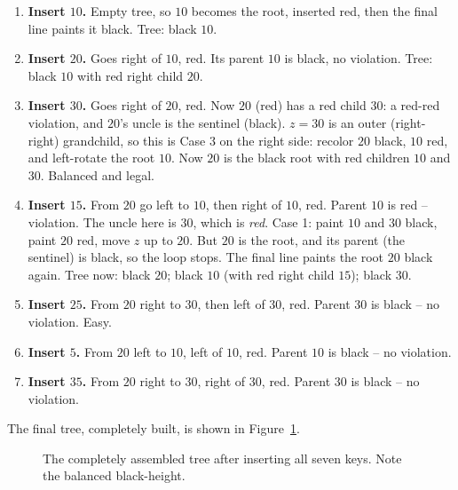\begin{enumerate}
\item \textbf{Insert $10$.} Empty tree, so $10$ becomes the root, inserted red,
then the final line paints it black. Tree: black $10$.
\item \textbf{Insert $20$.} Goes right of $10$, red. Its parent $10$ is black, no
violation. Tree: black $10$ with red right child $20$.
\item \textbf{Insert $30$.} Goes right of $20$, red. Now $20$ (red) has a red
child $30$: a red-red violation, and $20$'s uncle is the sentinel (black). $z=30$
is an outer (right-right) grandchild, so this is Case 3 on the right side:
recolor $20$ black, $10$ red, and left-rotate the root $10$. Now $20$ is the black
root with red children $10$ and $30$. Balanced and legal.
\item \textbf{Insert $15$.} From $20$ go left to $10$, then right of $10$, red.
Parent $10$ is red -- violation. The uncle here is $30$, which is \emph{red}.
Case 1: paint $10$ and $30$ black, paint $20$ red, move $z$ up to $20$. But $20$
is the root, and its parent (the sentinel) is black, so the loop stops. The final
line paints the root $20$ black again. Tree now: black $20$; black $10$ (with red
right child $15$); black $30$.
\item \textbf{Insert $25$.} From $20$ right to $30$, then left of $30$, red.
Parent $30$ is black -- no violation. Easy.
\item \textbf{Insert $5$.} From $20$ left to $10$, left of $10$, red. Parent $10$
is black -- no violation.
\item \textbf{Insert $35$.} From $20$ right to $30$, right of $30$, red. Parent
$30$ is black -- no violation.
\end{enumerate}

The final tree, completely built, is shown in Figure~\ref{fig:worked-insertion}.

\begin{figure}[htbp]
\centering
{}
\caption{The completely assembled tree after inserting all seven keys. Note the balanced black-height.}
\label{fig:worked-insertion}
\end{figure}

